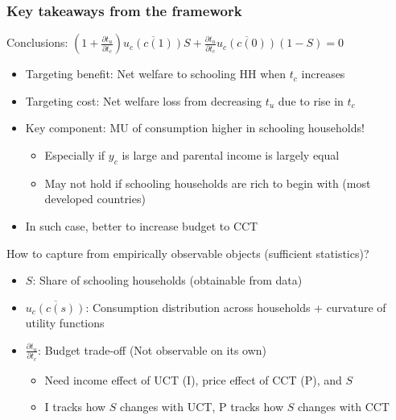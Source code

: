 \documentclass[aspectratio=169]{beamer}
\begin{document}
\begin{frame}
\frametitle{Key takeaways from the framework}
Conclusions: $(1+\frac{\partial t_u}{\partial t_c})\overline{u_c(c(1))}S+\frac{\partial t_u}{\partial t_c}\overline{u_c(c(0))}(1-S)=0$
\begin{itemize}\setlength\itemsep{3pt}
\item Targeting benefit: Net welfare to schooling HH when $t_c$ increases
\item Targeting cost: Net welfare loss from decreasing $t_u$ due to rise in $t_c$
\item Key component: MU of consumption higher in schooling households!
\begin{itemize}\setlength\itemsep{3pt}
  \item Especially if $y_c$ is large and parental income is largely equal
  \item May not hold if schooling households are rich to begin with (most developed countries)
\end{itemize}
\item In such case, better to increase budget to CCT 
\end{itemize}\medskip
How to capture from empirically observable objects (sufficient statistics)?
\begin{itemize}\setlength\itemsep{3pt}
\item $S$: Share of schooling households (obtainable from data)
\item $\overline{u_c(c(s))}$: Consumption distribution across households + curvature of utility functions
\item $\frac{\partial t_u}{\partial t_c}$: Budget trade-off (Not observable on its own)
\begin{itemize}\setlength\itemsep{3pt}
  \item Need income effect of UCT (I), price effect of CCT (P), and $S$
  \item I tracks how $S$ changes with UCT, P tracks how $S$ changes with CCT
\end{itemize}
\end{itemize}
\end{frame}
\end{document}
